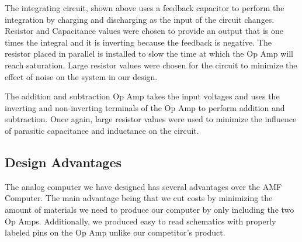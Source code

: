 \documentclass[11pt]{article}
\begin{document}
	The integrating circuit, shown above uses a feedback capacitor to perform the integration by charging and discharging as the input of the circuit changes. Resistor and Capacitance values were chosen to provide an output that is one times the integral and it is inverting because the feedback is negative. The resistor placed in parallel is installed to slow the time at which the Op Amp will reach saturation. Large resistor values were chosen for the circuit to minimize the effect of noise on the system in our design.
	
	The addition and subtraction Op Amp takes the input voltages and uses the inverting and non-inverting terminals of the Op Amp to perform addition and subtraction. Once again, large resistor values were used to minimize the influence of parasitic capacitance and inductance on the circuit. 
\subsection*{Design Advantages}	
	The analog computer we have designed has several advantages over the AMF Computer. The main advantage being that we cut costs by minimizing the amount of materials we need to produce our computer by only including the two Op Amps. Additionally, we produced easy to read schematics with properly labeled pins on the Op Amp unlike our competitor's product.
	 
	
\end{document}
